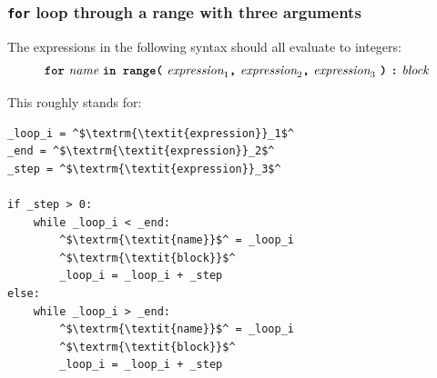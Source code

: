 \subsubsection*{\texttt{\textbf{for}} loop through a range with three arguments}

The expressions in the following syntax should all evaluate to integers:
\[
  \textbf{\texttt{for}}\ \textit{name}\ \textbf{\texttt{in
    range(}}\ \textit{expression}_1
    \textbf{\texttt{,}}\ \textit{expression}_2
  \textbf{\texttt{,}}\ \textit{expression}_3\ \textbf{\texttt{)}}\ \textbf{\texttt{:}}\ \textit{block}
\]

This roughly stands for:
\begin{center}
  \begin{minipage}{90mm}
\begin{lstlisting}
_loop_i = ^$\textrm{\textit{expression}}_1$^
_end = ^$\textrm{\textit{expression}}_2$^
_step = ^$\textrm{\textit{expression}}_3$^

if _step > 0:
    while _loop_i < _end:
        ^$\textrm{\textit{name}}$^ = _loop_i
        ^$\textrm{\textit{block}}$^
        _loop_i = _loop_i + _step
else:
    while _loop_i > _end:
        ^$\textrm{\textit{name}}$^ = _loop_i
        ^$\textrm{\textit{block}}$^
        _loop_i = _loop_i + _step
\end{lstlisting}
  \end{minipage}
\end{center}
